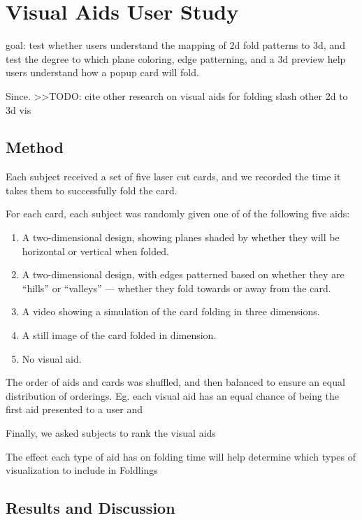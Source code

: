 \section{Visual Aids User Study}\label{visual-aids-user-study}

goal: test whether users understand the mapping of 2d fold patterns to
3d, and test the degree to which plane coloring, edge patterning, and a
3d preview help users understand how a popup card will fold.

Since. \textgreater{}\textgreater{}TODO: cite other research on visual
aids for folding slash other 2d to 3d vis

\subsection{Method}\label{method}

Each subject received a set of five laser cut cards, and we recorded the
time it takes them to successfully fold the card.

For each card, each subject was randomly given one of of the following
five aids:

\begin{enumerate}
\def\labelenumi{\arabic{enumi})}
\itemsep1pt\parskip0pt
\item
  A two-dimensional design, showing planes shaded by whether they will
  be horizontal or vertical when folded.
\item
  A two-dimensional design, with edges patterned based on whether they
  are ``hills'' or ``valleys'' --- whether they fold towards or away
  from the card.
\item
  A video showing a simulation of the card folding in three dimensions.
\item
  A still image of the card folded in dimension.
\item
  No visual aid.
\end{enumerate}

The order of aids and cards was shuffled, and then balanced to ensure an
equal distribution of orderings. Eg. each visual aid has an equal chance
of being the first aid presented to a user and

Finally, we asked subjects to rank the visual aids

The effect each type of aid has on folding time will help determine
which types of visualization to include in Foldlings

\subsection{Results and Discussion}\label{results-and-discussion}

